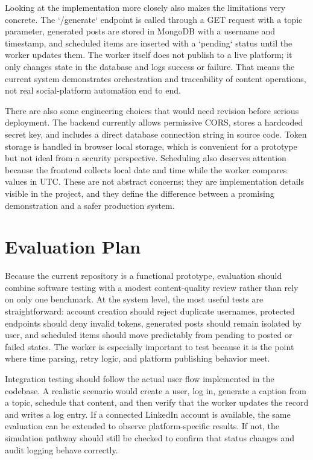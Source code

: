 \documentclass[conference]{IEEEtran}
\begin{document}
Looking at the implementation more closely also makes the limitations very concrete. The `/generate` endpoint is called through a GET request with a topic parameter, generated posts are stored in MongoDB with a username and timestamp, and scheduled items are inserted with a `pending` status until the worker updates them. The worker itself does not publish to a live platform; it only changes state in the database and logs success or failure. That means the current system demonstrates orchestration and traceability of content operations, not real social-platform automation end to end.

There are also some engineering choices that would need revision before serious deployment. The backend currently allows permissive CORS, stores a hardcoded secret key, and includes a direct database connection string in source code. Token storage is handled in browser local storage, which is convenient for a prototype but not ideal from a security perspective. Scheduling also deserves attention because the frontend collects local date and time while the worker compares values in UTC. These are not abstract concerns; they are implementation details visible in the project, and they define the difference between a promising demonstration and a safer production system.

\section{Evaluation Plan}

Because the current repository is a functional prototype, evaluation should combine software testing with a modest content-quality review rather than rely on only one benchmark. At the system level, the most useful tests are straightforward: account creation should reject duplicate usernames, protected endpoints should deny invalid tokens, generated posts should remain isolated by user, and scheduled items should move predictably from pending to posted or failed states. The worker is especially important to test because it is the point where time parsing, retry logic, and platform publishing behavior meet.

Integration testing should follow the actual user flow implemented in the codebase. A realistic scenario would create a user, log in, generate a caption from a topic, schedule that content, and then verify that the worker updates the record and writes a log entry. If a connected LinkedIn account is available, the same evaluation can be extended to observe platform-specific results. If not, the simulation pathway should still be checked to confirm that status changes and audit logging behave correctly.
\end{document}

